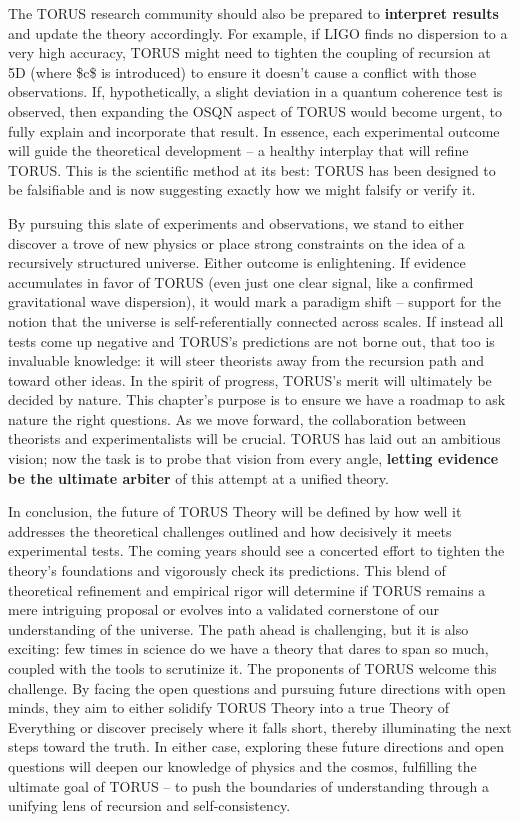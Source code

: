 \documentclass[]{article}
\begin{document}
The TORUS research community should also be prepared to
\textbf{interpret results} and update the theory accordingly. For
example, if LIGO finds no dispersion to a very high accuracy, TORUS
might need to tighten the coupling of recursion at 5D (where \$c\$ is
introduced) to ensure it doesn't cause a conflict with those
observations. If, hypothetically, a slight deviation in a quantum
coherence test is observed, then expanding the OSQN aspect of TORUS
would become urgent, to fully explain and incorporate that result. In
essence, each experimental outcome will guide the theoretical
development -- a healthy interplay that will refine TORUS. This is the
scientific method at its best: TORUS has been designed to be falsifiable
and is now suggesting exactly how we might falsify or verify it​.

By pursuing this slate of experiments and observations, we stand to
either discover a trove of new physics or place strong constraints on
the idea of a recursively structured universe. Either outcome is
enlightening. If evidence accumulates in favor of TORUS (even just one
clear signal, like a confirmed gravitational wave dispersion), it would
mark a paradigm shift -- support for the notion that the universe is
self-referentially connected across scales. If instead all tests come up
negative and TORUS's predictions are not borne out, that too is
invaluable knowledge: it will steer theorists away from the recursion
path and toward other ideas. In the spirit of progress, TORUS's merit
will ultimately be decided by nature. This chapter's purpose is to
ensure we have a roadmap to ask nature the right questions. As we move
forward, the collaboration between theorists and experimentalists will
be crucial. TORUS has laid out an ambitious vision; now the task is to
probe that vision from every angle, \textbf{letting evidence be the
ultimate arbiter} of this attempt at a unified theory.

In conclusion, the future of TORUS Theory will be defined by how well it
addresses the theoretical challenges outlined and how decisively it
meets experimental tests. The coming years should see a concerted effort
to tighten the theory's foundations and vigorously check its
predictions. This blend of theoretical refinement and empirical rigor
will determine if TORUS remains a mere intriguing proposal or evolves
into a validated cornerstone of our understanding of the universe. The
path ahead is challenging, but it is also exciting: few times in science
do we have a theory that dares to span so much, coupled with the tools
to scrutinize it. The proponents of TORUS welcome this challenge. By
facing the open questions and pursuing future directions with open
minds, they aim to either solidify TORUS Theory into a true Theory of
Everything or discover precisely where it falls short, thereby
illuminating the next steps toward the truth. In either case, exploring
these future directions and open questions will deepen our knowledge of
physics and the cosmos, fulfilling the ultimate goal of TORUS -- to push
the boundaries of understanding through a unifying lens of recursion and
self-consistency.
\end{document}
